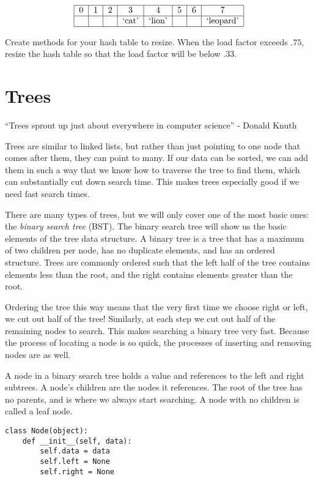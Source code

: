 \[
\begin{tabular}{|c|c|c|c|c|c|c|c|}
\hline
0 & 1 & 2 & 3 & 4 & 5 & 6 & 7 \\
\hline
 & & & `cat' & `lion' & & &`leopard' \\
\hline
\end{tabular}
\]

\begin{problem}
Create methods for your hash table to resize.
When the load factor exceeds $.75$, resize the hash table so that the load factor will be below $.33$.
\label{prob:Hash3}
\end{problem}

\section*{Trees}
``Trees sprout up just about everywhere in computer science'' - Donald Knuth

Trees are similar to linked lists, but rather than just pointing to one node that comes after them, they can point to many.
If our data can be sorted, we can add them in such a way that we know how to traverse the tree to find them, which can substantially cut down search time.
This makes trees especially good if we need fast search times.

There are many types of trees, but we will only cover one of the most basic ones: the \emph{binary search tree} (BST).
The binary search tree will show us the basic elements of the tree data structure.
A binary tree is a tree that has a maximum of two children per node,
has no duplicate elements, and has an ordered structure.
Trees are commonly ordered such that the left half of the tree contains elements less than the root, and the right contains elements greater than the root.

Ordering the tree this way means that the very first time we choose right or left, we cut out half of the tree!
Similarly, at each step we cut out half of the remaining nodes to search.
This makes searching a binary tree very fast.
Because the process of locating a node is so quick, the processes of inserting and removing nodes are as well.

A node in a binary search tree holds a value and references to the left and right subtrees.
A node's children are the nodes it references.
The root of the tree has no parents, and is where we always start searching.
A node with no children is called a leaf node.

\begin{lstlisting}
class Node(object):
    def __init__(self, data):
        self.data = data
        self.left = None
        self.right = None
\end{lstlisting}

